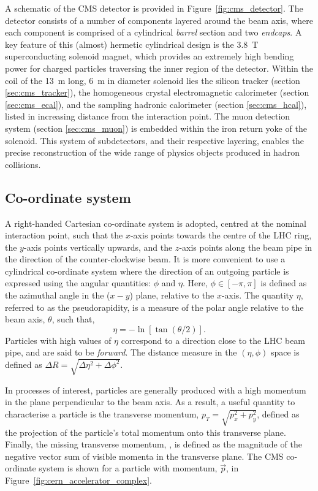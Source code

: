 A schematic of the CMS detector is provided in Figure~\ref{fig:cms_detector}. The detector consists of a number of components layered around the beam axis, where each component is comprised of a cylindrical \textit{barrel} section and two \textit{endcaps}. A key feature of this (almost) hermetic cylindrical design is the 3.8~T superconducting solenoid magnet, which provides an extremely high bending power for charged particles traversing the inner region of the detector. Within the coil of the 13~m long, 6~m in diameter solenoid lies the silicon tracker (section \ref{sec:cms_tracker}), the homogeneous crystal electromagnetic calorimeter (section \ref{sec:cms_ecal}), and the sampling hadronic calorimeter (section \ref{sec:cms_hcal}), listed in increasing distance from the interaction point. The muon detection system (section \ref{sec:cms_muon}) is embedded within the iron return yoke of the solenoid. This system of subdetectors, and their respective layering, enables the precise reconstruction of the wide range of physics objects produced in hadron collisions.

\subsection{Co-ordinate system}
A right-handed Cartesian co-ordinate system is adopted, centred at the nominal interaction point, such that the $x$-axis points towards the centre of the LHC ring, the $y$-axis points vertically upwards, and the $z$-axis points along the beam pipe in the direction of the counter-clockwise beam. It is more convenient to use a cylindrical co-ordinate system where the direction of an outgoing particle is expressed using the angular quantities: $\phi$ and $\eta$. Here, $\phi \in [-\pi,\pi]$ is defined as the azimuthal angle in the ($x-y$) plane, relative to the $x$-axis. The quantity $\eta$, referred to as the pseudorapidity, is a measure of the polar angle relative to the beam axis, $\theta$, such that,
\begin{equation}
    \eta = - \ln[\tan(\theta/2)].
\end{equation}
Particles with high values of $\eta$ correspond to a direction close to the LHC beam pipe, and are said to be \textit{forward}. The distance measure in the $(\eta,\phi)$ space is defined as $\Delta R = \sqrt{\Delta\eta^2+\Delta\phi^2}$. 

In processes of interest, particles are generally produced with a high momentum in the plane perpendicular to the beam axis. As a result, a useful quantity to characterise a particle is the transverse momentum, $p_T = \sqrt{p_x^2+p_y^2}$, defined as the projection of the particle's total momentum onto this transverse plane. Finally, the missing transverse momentum, \met, is defined as the magnitude of the negative vector sum of visible momenta in the transverse plane. The CMS co-ordinate system is shown for a particle with momentum, $\vec{p}$, in Figure~\ref{fig:cern_accelerator_complex}.

